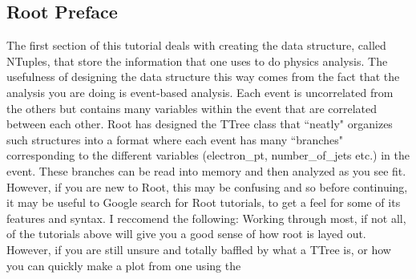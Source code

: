 \documentclass[12pt]{article}
\begin{document}
\subsection{Root Preface}
The first section of this tutorial deals with creating the data structure, called NTuples, that store the information that one uses to do physics analysis.  The usefulness of designing the data structure this way comes from the fact that the analysis you are doing is event-based analysis.  Each event is uncorrelated from the others but contains many variables within the event that are correlated between each other.  Root has designed the TTree class that ``neatly" organizes such structures into a format where each event has many ``branches" corresponding to the different variables (electron\_pt, number\_of\_jets etc.) in the event.  These branches can be read into memory and then analyzed as you see fit.  However, if you are new to Root, this may be confusing and so before continuing, it may be useful to Google search for Root tutorials, to get a feel for some of its features and syntax.  I reccomend the following:
Working through most, if not all, of the tutorials above will give you a good sense of how root is layed out.  However, if you are still unsure and totally baffled by what a TTree is, or how you can quickly make a plot from one using the %
\end{document}
